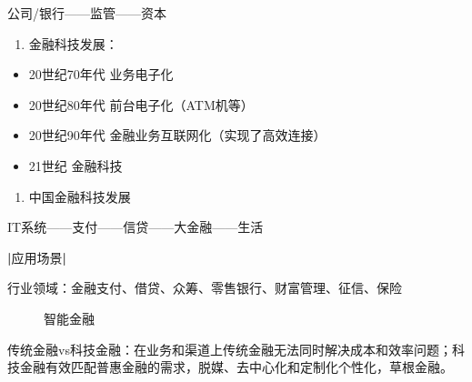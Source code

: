 \documentclass[letterpaper,11pt,english]{sphinxmanual}
\begin{document}
\begin{center}
{{\begin{enumerate}
\end{enumerate}

公司/银行——监管——资本
\begin{enumerate}
%
\setcounter{enumi}{1}
\item {} 
金融科技发展：

\end{enumerate}
\begin{itemize}
\item {} 
20世纪70年代 业务电子化

\item {} 
20世纪80年代 前台电子化（ATM机等）

\item {} 
20世纪90年代 金融业务互联网化（实现了高效连接）

\item {} 
21世纪 金融科技

\end{itemize}
\begin{enumerate}
%
\setcounter{enumi}{2}
\item {} 
中国金融科技发展

\end{enumerate}

IT系统——支付——信贷——大金融——生活

{\color{red}\bfseries{}|}应用场景{\color{red}\bfseries{}|}%
\begin{footnote}[949]\sphinxAtStartFootnote
{}
%
\end{footnote}
行业领域：金融支付、借贷、众筹、零售银行、财富管理、征信、保险

\begin{figure}[H]
\centering
\capstart

\noindent{}
\caption{智能金融\sphinxfootnotemark[950]}\label{\detokenize{chapter_AI+Finance/FinTech:id17}}\end{figure}
%
\begin{footnotetext}[950]\sphinxAtStartFootnote
{}
%
\end{footnotetext}\ignorespaces 
传统金融vs科技金融：在业务和渠道上传统金融无法同时解决成本和效率问题；科技金融有效匹配普惠金融的需求，脱媒、去中心化和定制化个性化，草根金融。


}}
\end{center}
\end{document}
